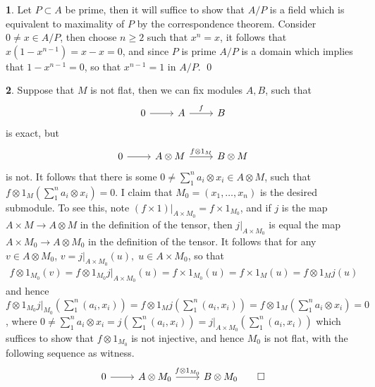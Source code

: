 \documentclass[11pt]{article}
\theoremstyle{definition}
\newtheorem{pb}{}
\begin{document}
    \begin{pb}
        Let \(P \subset A\) be prime, then it will suffice to show that \(A/P\) is a field which is equivalent to maximality of \(P\) by the correspondence theorem. Consider \(0 \neq x \in A/P\), then choose \(n \geq 2\) such that \(x^n = x\), it follows that \(x(1-x^{n-1}) = x-x = 0\), and since \(P\) is prime \(A/P\) is a domain which implies that \(1-x^{n-1} = 0\), so that \(x^{n-1} = 1\) in \(A/P\). \qed
    \end{pb}
    \begin{pb}
        Suppose that \(M\) is not flat, then we can fix modules \(A,B\), such that
        \begin{equation*}
            \begin{tikzcd}
                0 \arrow[r,"{}"] & A \arrow[r,"{f}"] & B
            \end{tikzcd}
        \end{equation*}
        is exact, but
        \begin{equation*}
            \begin{tikzcd}
                0 \arrow[r,"{}"] & A\otimes M \arrow[r,"{f\otimes1_M}"] & B \otimes M
            \end{tikzcd}
        \end{equation*}
        is not. It follows that there is some \(0 \neq \sum_1^n a_i \otimes x_i \in A \otimes M\), such that \(f\otimes1_M(\sum_1^n a_i\otimes x_i) = 0\). I claim that \(M_0 = (x_1,\hdots,x_n)\) is the desired submodule. To see this, note \((f \times 1)\vert_{A \times M_0} = f\times 1_{M_0}\), and if \(j\) is the map \(A \times M \to A \otimes M\) in the definition of the tensor, then \(j\vert_{A \times M_0}\) is equal the map \(A \times M_0 \to A \otimes M_0\) in the definition of the tensor. It follows that for any \(v \in A \otimes M_0\), \(v = j\vert_{A \times M_0}(u), \; u \in A \times M_0\), so that
        \begin{align*}
            f \otimes 1_{M_0}(v) = f \otimes 1_{M_0}j\vert_{A \times M_0}(u) = f \times 1_{M_0}(u) = f \times 1_M (u) = f\otimes1_Mj(u)
        \end{align*}
        and hence \(f \otimes 1_{M_0}j\vert_{M_0}(\sum_1^n (a_i, x_i)) = f\otimes1_Mj(\sum_1^n (a_i,x_i)) = f\otimes1_M(\sum_1^n a_i \otimes x_i) = 0\), where \(0 \neq \sum_1^n a_i \otimes x_i =  j(\sum_1^n (a_i,x_i)) = j\vert_{A \times M_0}(\sum_1^n (a_i,x_i))\) which suffices to show that \(f \otimes 1_{M_0}\) is not injective, and hence \(M_0\) is not flat, with the following sequence as witness.
        \begin{equation*}
            \begin{tikzcd}
                0 \arrow[r,"{}"] &A \otimes M_0 \arrow[r,"{f \otimes 1_{M_0}}"] &B \otimes M_0 \qed
            \end{tikzcd}
        \end{equation*}
    \end{pb}
\end{document}
